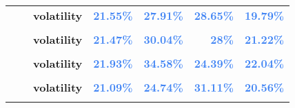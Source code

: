 \documentclass[
  authoryear,
  preprint,
  3p]{elsarticle}
\begin{document}
\begin{longtable}[t]{>{}l>{}l>{}l>{}r>{}r>{}r>{}r}
\textbf{} & \textbf{} & \textbf{volatility} & \textcolor[HTML]{4285f4}{\textbf{21.55\%}} & \textcolor[HTML]{4285f4}{\textbf{27.91\%}} & \textcolor[HTML]{4285f4}{\textbf{28.65\%}} & \textcolor[HTML]{4285f4}{\textbf{19.79\%}}\\
\textbf{\cellcolor{gray!10}{Soybeans (XCBT)}} & \textbf{\cellcolor{gray!10}{whole period}} & \textbf{\cellcolor{gray!10}{mean}} & \textcolor[HTML]{4285f4}{\textbf{\cellcolor{gray!10}{6.89\%}}} & \textcolor[HTML]{4285f4}{\textbf{\cellcolor{gray!10}{13.36\%}}} & \textcolor[HTML]{4285f4}{\textbf{\cellcolor{gray!10}{6.19\%}}} & \textcolor[HTML]{4285f4}{\textbf{\cellcolor{gray!10}{-3.82\%}}}\\
\addlinespace
\textbf{} & \textbf{} & \textbf{volatility} & \textcolor[HTML]{4285f4}{\textbf{21.47\%}} & \textcolor[HTML]{4285f4}{\textbf{30.04\%}} & \textcolor[HTML]{4285f4}{\textbf{28\%}} & \textcolor[HTML]{4285f4}{\textbf{21.22\%}}\\
\textbf{\cellcolor{gray!10}{}} & \textbf{\cellcolor{gray!10}{backwardation}} & \textbf{\cellcolor{gray!10}{mean}} & \textcolor[HTML]{4285f4}{\textbf{\cellcolor{gray!10}{13.69\%}}} & \textcolor[HTML]{4285f4}{\textbf{\cellcolor{gray!10}{0.93\%}}} & \textcolor[HTML]{4285f4}{\textbf{\cellcolor{gray!10}{13.42\%}}} & \textcolor[HTML]{4285f4}{\textbf{\cellcolor{gray!10}{-11.45\%}}}\\
\textbf{} & \textbf{} & \textbf{volatility} & \textcolor[HTML]{4285f4}{\textbf{21.93\%}} & \textcolor[HTML]{4285f4}{\textbf{34.58\%}} & \textcolor[HTML]{4285f4}{\textbf{24.39\%}} & \textcolor[HTML]{4285f4}{\textbf{22.04\%}}\\
\textbf{\cellcolor{gray!10}{}} & \textbf{\cellcolor{gray!10}{contango}} & \textbf{\cellcolor{gray!10}{mean}} & \textcolor[HTML]{4285f4}{\textbf{\cellcolor{gray!10}{-0.16\%}}} & \textcolor[HTML]{4285f4}{\textbf{\cellcolor{gray!10}{25.71\%}}} & \textcolor[HTML]{4285f4}{\textbf{\cellcolor{gray!10}{0.96\%}}} & \textcolor[HTML]{4285f4}{\textbf{\cellcolor{gray!10}{3.75\%}}}\\
\textbf{} & \textbf{} & \textbf{volatility} & \textcolor[HTML]{4285f4}{\textbf{21.09\%}} & \textcolor[HTML]{4285f4}{\textbf{24.74\%}} & \textcolor[HTML]{4285f4}{\textbf{31.11\%}} & \textcolor[HTML]{4285f4}{\textbf{20.56\%}}\\
\addlinespace
\textbf{\cellcolor{gray!10}{Wheat-SRW (XCBT)}} & \textbf{\cellcolor{gray!10}{whole period}} & \textbf{\cellcolor{gray!10}{mean}} & \textcolor[HTML]{4285f4}{\textbf{\cellcolor{gray!10}{5.07\%}}} & \textcolor[HTML]{4285f4}{\textbf{\cellcolor{gray!10}{17.63\%}}} & \textcolor[HTML]{4285f4}{\textbf{\cellcolor{gray!10}{6.68\%}}} & \textcolor[HTML]{4285f4}{\textbf{\cellcolor{gray!10}{-1.58\%}}}\\

\end{longtable}
\end{document}
